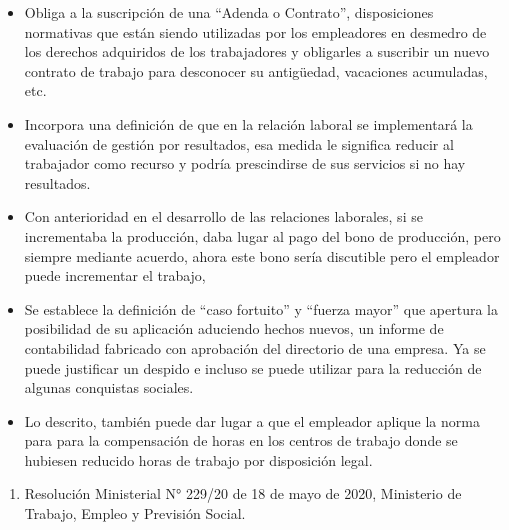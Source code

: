 \documentclass[a4paper, nobind]{templates/ociamthesis}
\providecommand{\tightlist}{%
  \setlength{\itemsep}{0pt}\setlength{\parskip}{0pt}}
\begin{document}
\begin{itemize}
\tightlist
\item
  Obliga a la suscripción de una ``Adenda o Contrato'', disposiciones normativas que están siendo utilizadas por los empleadores en desmedro de los derechos adquiridos de los trabajadores y obligarles a suscribir un nuevo contrato de trabajo para desconocer su antigüedad, vacaciones acumuladas, etc.
\item
  Incorpora una definición de que en la relación laboral se implementará la evaluación de gestión por resultados, esa medida le significa reducir al trabajador como recurso y podría prescindirse de sus servicios si no hay resultados.
\item
  Con anterioridad en el desarrollo de las relaciones laborales, si se incrementaba la producción, daba lugar al pago del bono de producción, pero siempre mediante acuerdo, ahora este bono sería discutible pero el empleador puede incrementar el trabajo,
\item
  Se establece la definición de ``caso fortuito'' y ``fuerza mayor'' que apertura la posibilidad de su aplicación aduciendo hechos nuevos, un informe de contabilidad fabricado con aprobación del directorio de una empresa. Ya se puede justificar un despido e incluso se puede utilizar para la reducción de algunas conquistas sociales.
\item
  Lo descrito, también puede dar lugar a que el empleador aplique la norma para para la compensación de horas en los centros de trabajo donde se hubiesen reducido horas de trabajo por disposición legal.
\end{itemize}

\begin{enumerate}
\def\labelenumi{\arabic{enumi}.}
\setcounter{enumi}{1}
\tightlist
\item
  Resolución Ministerial N° 229/20 de 18 de mayo de 2020, Ministerio de Trabajo, Empleo y Previsión Social.
\end{enumerate}
\end{document}
